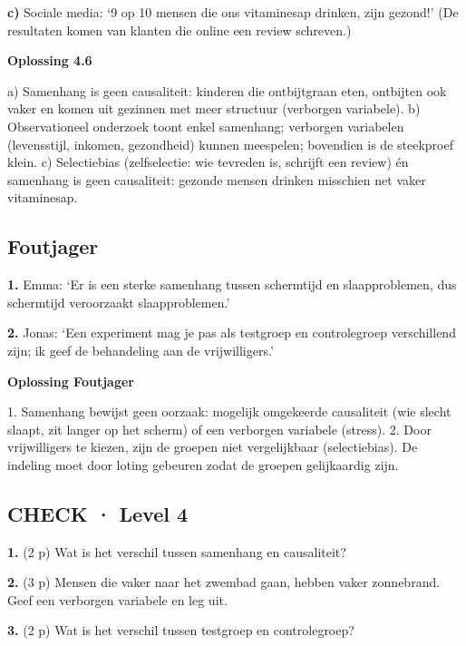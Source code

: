 \textbf{c)} Sociale media: ‘9 op 10 mensen die ons vitaminesap drinken, zijn gezond!’ (De resultaten komen van klanten die online een review schreven.) \lijn

\begin{oplossing}
\textbf{Oplossing 4.6}

a) Samenhang is geen causaliteit: kinderen die ontbijtgraan eten, ontbijten ook vaker en komen uit gezinnen met meer structuur (verborgen variabele). b) Observationeel onderzoek toont enkel samenhang; verborgen variabelen (levensstijl, inkomen, gezondheid) kunnen meespelen; bovendien is de steekproef klein. c) Selectiebias (zelfselectie: wie tevreden is, schrijft een review) én samenhang is geen causaliteit: gezonde mensen drinken misschien net vaker vitaminesap.
\end{oplossing}

\subsection*{Foutjager}

\textbf{1.} Emma: ‘Er is een sterke samenhang tussen schermtijd en slaapproblemen, dus schermtijd veroorzaakt slaapproblemen.’ \lijn

\textbf{2.} Jonas: ‘Een experiment mag je pas als testgroep en controlegroep verschillend zijn; ik geef de behandeling aan de vrijwilligers.’ \lijn

\begin{oplossing}
\textbf{Oplossing Foutjager}

1. Samenhang bewijst geen oorzaak: mogelijk omgekeerde causaliteit (wie slecht slaapt, zit langer op het scherm) of een verborgen variabele (stress). 2. Door vrijwilligers te kiezen, zijn de groepen niet vergelijkbaar (selectiebias). De indeling moet door loting gebeuren zodat de groepen gelijkaardig zijn.
\end{oplossing}

\subsection*{CHECK · Level 4}

\textbf{1.} (2 p) Wat is het verschil tussen samenhang en causaliteit? \lijn

\textbf{2.} (3 p) Mensen die vaker naar het zwembad gaan, hebben vaker zonnebrand. Geef een verborgen variabele en leg uit. \lijn

\textbf{3.} (2 p) Wat is het verschil tussen testgroep en controlegroep? \lijn


